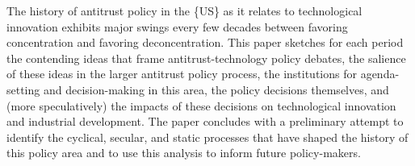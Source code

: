 The history of antitrust policy in the \{US\} as it relates to technological innovation exhibits major swings every few decades between favoring concentration and favoring deconcentration. This paper sketches for each period the contending ideas that frame antitrust-technology policy debates, the salience of these ideas in the larger antitrust policy process, the institutions for agenda-setting and decision-making in this area, the policy decisions themselves, and (more speculatively) the impacts of these decisions on technological innovation and industrial development. The paper concludes with a preliminary attempt to identify the cyclical, secular, and static processes that have shaped the history of this policy area and to use this analysis to inform future policy-makers.
